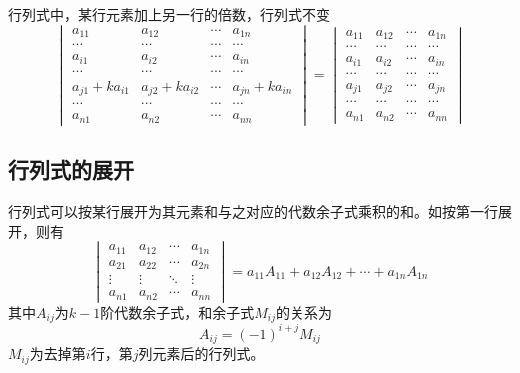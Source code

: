 \begin{property}
    行列式中，某行元素加上另一行的倍数，行列式不变
    \[
        \begin{vmatrix}
            a_{11}         & a_{12}         & \cdots & a_{1n}         \\
            \cdots         & \cdots         & \cdots & \cdots         \\
            a_{i1}         & a_{i2}         & \cdots & a_{in}         \\
            \cdots         & \cdots         & \cdots & \cdots         \\
            a_{j1}+ka_{i1} & a_{j2}+ka_{i2} & \cdots & a_{jn}+ka_{in} \\
            \cdots         & \cdots         & \cdots & \cdots         \\
            a_{n1}         & a_{n2}         & \cdots & a_{nn}
        \end{vmatrix}
        =
        \begin{vmatrix}
            a_{11} & a_{12} & \cdots & a_{1n} \\
            \cdots & \cdots & \cdots & \cdots \\
            a_{i1} & a_{i2} & \cdots & a_{in} \\
            \cdots & \cdots & \cdots & \cdots \\
            a_{j1} & a_{j2} & \cdots & a_{jn} \\
            \cdots & \cdots & \cdots & \cdots \\
            a_{n1} & a_{n2} & \cdots & a_{nn}
        \end{vmatrix}
    \]
\end{property}

\subsection{行列式的展开}
行列式可以按某行展开为其元素和与之对应的代数余子式乘积的和。如按第一行展开，则有
\[
    \begin{vmatrix}
        a_{11} & a_{12} & \cdots & a_{1n} \\
        a_{21} & a_{22} & \cdots & a_{2n} \\
        \vdots & \vdots & \ddots & \vdots \\
        a_{n1} & a_{n2} & \cdots & a_{nn}
    \end{vmatrix}
    =
    a_{11}A_{11} + a_{12}A_{12} + \cdots + a_{1n}A_{1n}
\]
其中$A_{ij}$为$k-1$阶代数余子式，和余子式$M_{ij}$的关系为
\[ A_{ij} = (-1)^{i+j}M_{ij} \]
$M_{ij}$为去掉第$i$行，第$j$列元素后的行列式。

